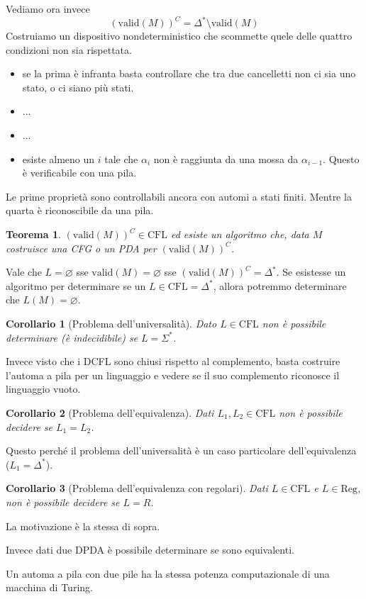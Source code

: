 \documentclass[12pt]{article}
\newtheorem{teorema}{Teorema}
\newtheorem{corollario}{Corollario}
\begin{document}
Vediamo ora invece
$$ ( \text{valid}(M) )^C = \Delta^* \setminus \text{valid}(M) $$
Costruiamo un dispositivo nondeterministico che scommette quele delle quattro condizioni non sia rispettata.
\begin{itemize}
	\item se la prima è infranta basta controllare che tra due cancelletti non ci sia uno stato, o ci siano più stati.
	\item ...
	\item ...
	\item esiste almeno un $i$ tale che $\alpha_i$ non è raggiunta da una mossa da $\alpha_{i - 1}$.
		Questo è verificabile con una pila.
\end{itemize}
Le prime proprietà sono controllabili ancora con automi a stati finiti.
Mentre la quarta è riconoscibile da una pila.
\begin{teorema}
	$(\text{valid}(M))^C \in \text{CFL}$ ed esiste un algoritmo che, data $M$ costruisce una CFG o un PDA per $(\text{valid}(M))^C$.
\end{teorema}
Vale che $L = \varnothing$ sse $\text{valid}(M) = \varnothing$ sse $(\text{valid}(M))^C = \Delta^*$.
Se esistesse un algoritmo per determinare se un $L \in \text{CFL} = \Delta^*$, allora potremmo determinare che $L(M) = \varnothing$.
\begin{corollario}[Problema dell'universalità]
	Dato $L \in \text{CFL}$ non è possibile determinare (è indecidibile) se $L = \Sigma^*$.
\end{corollario}
Invece visto che i DCFL sono chiusi rispetto al complemento, basta costruire l'automa a pila per un linguaggio e vedere se il suo complemento riconosce il linguaggio vuoto.
\begin{corollario}[Problema dell'equivalenza]
	Dati $L_1, L_2 \in \text{CFL}$ non è possibile decidere se $L_1 = L_2$.
\end{corollario}
Questo perché il problema dell'universalità è un caso particolare dell'equivalenza ($L_1 = \Delta^*$).

\begin{corollario}[Problema dell'equivalenza con regolari]
	Dati $L \in \text{CFL}$ e $L \in \text{Reg}$, non è possibile decidere se $L = R$.
\end{corollario}
La motivazione è la stessa di sopra.

Invece dati due DPDA è possibile determinare se sono equivalenti.

Un automa a pila con due pile ha la stessa potenza computazionale di una macchina di Turing.
\end{document}
